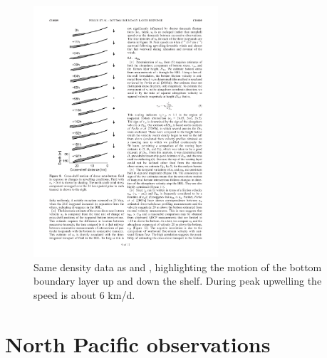 \begin{figure}[hbt]
  \begin{center}
  \includegraphics[width=2.7in]{figs/WindOverview/PerlinFig8}
    \caption{Same density data as  and , highlighting the motion of the bottom boundary layer up and down the shelf.  During peak upwelling the speed is about 6 km/d.}
    \label{fig:}  
  \end{center}
\end{figure}

\clearpage
\section{North Pacific observations} 

